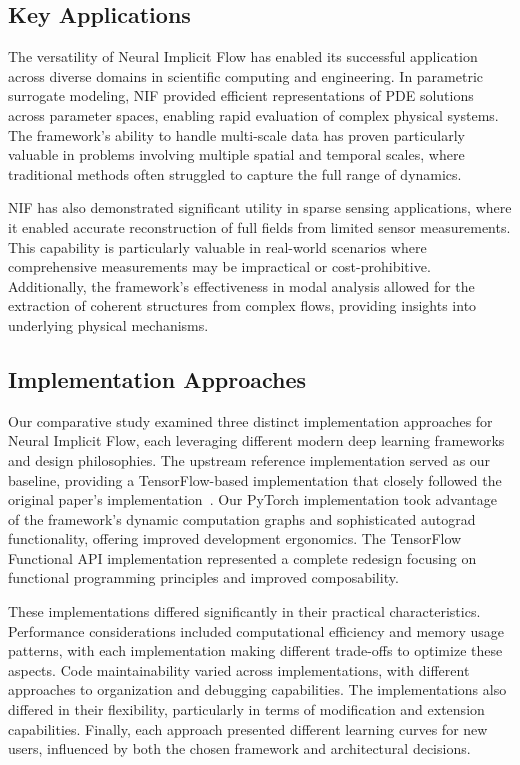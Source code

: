 \documentclass[10pt,journal,compsoc,onecolumn]{IEEEtran}
\begin{document}
\subsection{Key Applications}
The versatility of Neural Implicit Flow has enabled its successful application across diverse domains in scientific computing and engineering. In parametric surrogate modeling, NIF provided efficient representations of PDE solutions across parameter spaces, enabling rapid evaluation of complex physical systems. The framework's ability to handle multi-scale data has proven particularly valuable in problems involving multiple spatial and temporal scales, where traditional methods often struggled to capture the full range of dynamics.~\cite{nif2023}

NIF has also demonstrated significant utility in sparse sensing applications, where it enabled accurate reconstruction of full fields from limited sensor measurements. This capability is particularly valuable in real-world scenarios where comprehensive measurements may be impractical or cost-prohibitive. Additionally, the framework's effectiveness in modal analysis allowed for the extraction of coherent structures from complex flows, providing insights into underlying physical mechanisms.~\cite{nif2023}

\subsection{Implementation Approaches}
Our comparative study examined three distinct implementation approaches for Neural Implicit Flow, each leveraging different modern deep learning frameworks and design philosophies. The upstream reference implementation served as our baseline, providing a TensorFlow-based implementation that closely followed the original paper's implementation~\cite{nif2023github}. Our PyTorch implementation took advantage of the framework's dynamic computation graphs and sophisticated autograd functionality, offering improved development ergonomics. The TensorFlow Functional API implementation represented a complete redesign focusing on functional programming principles and improved composability.

These implementations differed significantly in their practical characteristics. Performance considerations included computational efficiency and memory usage patterns, with each implementation making different trade-offs to optimize these aspects. Code maintainability varied across implementations, with different approaches to organization and debugging capabilities. The implementations also differed in their flexibility, particularly in terms of modification and extension capabilities. Finally, each approach presented different learning curves for new users, influenced by both the chosen framework and architectural decisions.
\end{document}
